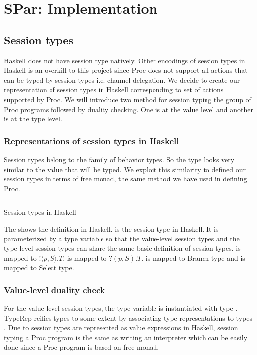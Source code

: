 \chapter{SPar: Implementation}
\section{Session types} \label{impl:sec:session}
Haskell does not have session type natively. Other encodings of session types in Haskell is an overkill to this project since Proc does not support all actions that can be typed by session types i.e. channel delegation. We decide to create our representation of session types in Haskell corresponding to set of actions supported by Proc. We will introduce two method for session typing the group of Proc programs followed by duality checking. One is at the value level and another is at the type level.
\subsection{Representations of session types in Haskell}
Session types belong to the family of behavior types. So the type looks very similar to the value that will be typed. We exploit this similarity to defined our session types in terms of free monad, the same method we have used in defining Proc.
\begin{listing}[ht]
    \inputminted{Haskell}{impl/type.hs}
    \caption{Session types in Haskell}
    \label{impl:code:type}
\end{listing}

The  shows the definition in Haskell.  is the session type in Haskell. It is parameterized by a type variable  so that the value-level session types and the type-level session types can share the same basic definition of session types.  is mapped to $! \langle p, S \rangle . T$.  is mapped to $?(p, S).T$.  is mapped to Branch type and  is mapped to Select type.
\subsection{Value-level duality check}
For the value-level session types, the type variable  is instantiated with type . TypeRep reifies types to some extent by associating type representations to types \cite{DataTypeable}. Due to session types are represented as value expressions in Haskell, session typing a Proc program is the same as writing an interpreter which can be easily done since a Proc program is based on free monad. 

